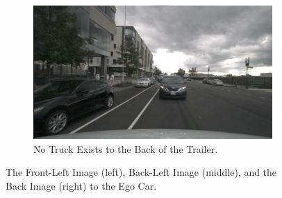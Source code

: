 \documentclass{article} %
\begin{document}
\begin{itemize}
\begin{figure}[H]
    \begin{subfigure}[t]{0.3\textwidth}
        \includegraphics[width=\linewidth]{Figures/exam1_back_trailer.png}
        \caption{\small No Truck Exists to the Back of the Trailer.}
    \end{subfigure}
    \caption{The Front-Left Image (left), Back-Left Image (middle), and the Back Image (right) to the Ego Car.}
    \label{fig:misaligned-examples}
\end{figure}


\end{itemize}
\end{document}
